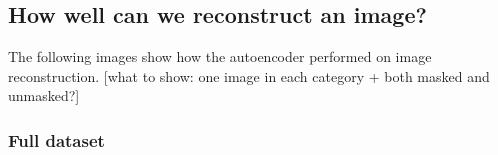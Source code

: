 \subsection{How well can we reconstruct an image?}


The following images show how the autoencoder performed on image reconstruction. [what to show: one image in each category + both masked and unmasked?]

\bigskip
\subsubsection{Full dataset}
\hfill
\hfill

